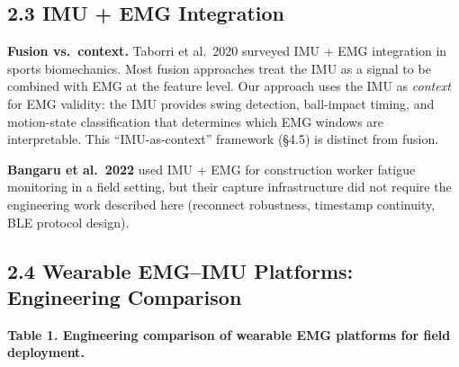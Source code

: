 \documentclass[sensors,article,submit,pdftex,moreauthors]{Definitions/mdpi}
\begin{document}
\subsection{2.3 IMU + EMG Integration}\label{imu-emg-integration}

\textbf{Fusion vs.~context.} Taborri et al.~2020 \citep{taborri2020} surveyed IMU + EMG integration in sports
biomechanics. Most fusion approaches treat the IMU as a signal to be combined with EMG at the
feature level. Our approach uses the IMU as \emph{context} for EMG validity: the IMU provides swing
detection, ball-impact timing, and motion-state classification that determines which EMG windows
are interpretable. This ``IMU-as-context'' framework (§4.5) is distinct from fusion.

\textbf{Bangaru et al.~2022} \citep{bangaru2022} used IMU + EMG for construction worker fatigue monitoring in a
field setting, but their capture infrastructure did not require the engineering work described
here (reconnect robustness, timestamp continuity, BLE protocol design).

\subsection{2.4 Wearable EMG--IMU Platforms: Engineering Comparison}\label{wearable-emgimu-platforms-engineering-comparison}

\textbf{Table 1. Engineering comparison of wearable EMG platforms for field deployment.}
\end{document}
